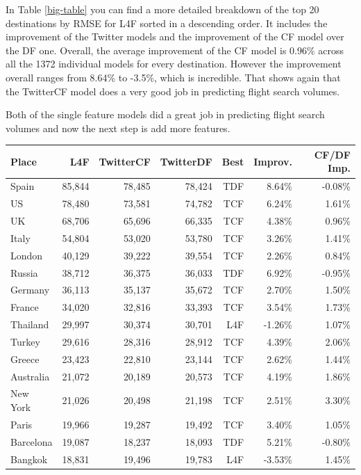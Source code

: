 \documentclass[minf,twoside,singlespacing,parskip,frontabs]{infthesis}
\begin{document}
In Table \ref{big-table} you can find a more detailed breakdown of the top 20 destinations by RMSE for L4F sorted in a descending order. It includes the improvement of the Twitter models and the improvement of the CF model over the DF one. Overall, the average improvement of the CF model is 0.96\% across all the 1372 individual models for every destination. However the improvement overall ranges from 8.64\% to -3.5\%, which is incredible. That shows again that the TwitterCF model does a very good job in predicting flight search volumes. 


Both of the single feature models did a great job in predicting flight search volumes and now the next step is add more features. 

\begin{table}[h]
\begin{center}
\begin{tabular}{ l | r | r | r | r | r | r }
Place & L4F &  TwitterCF & TwitterDF & Best & Improv. & CF/DF Imp. \\
\hline
Spain & 85,844 & 78,485 & 78,424 & TDF & 8.64\% & -0.08\%\\
US & 78,480 & 73,581 & 74,782 & TCF & 6.24\% & 1.61\%\\
UK & 68,706 & 65,696 & 66,335 & TCF & 4.38\% & 0.96\%\\
Italy & 54,804 & 53,020 & 53,780 & TCF & 3.26\% & 1.41\%\\
London & 40,129 & 39,222 & 39,554 & TCF & 2.26\% & 0.84\%\\
Russia & 38,712 & 36,375 & 36,033 & TDF & 6.92\% & -0.95\%\\
Germany & 36,113 & 35,137 & 35,672 & TCF & 2.70\% & 1.50\%\\
France & 34,020 & 32,816 & 33,393 & TCF & 3.54\% & 1.73\%\\
Thailand & 29,997 & 30,374 & 30,701 & L4F & -1.26\% & 1.07\%\\
Turkey & 29,616 & 28,316 & 28,912 & TCF & 4.39\% & 2.06\%\\
Greece & 23,423 & 22,810 & 23,144 & TCF & 2.62\% & 1.44\%\\
Australia & 21,072 & 20,189 & 20,573 & TCF & 4.19\% & 1.86\%\\
New York & 21,026 & 20,498 & 21,198 & TCF & 2.51\% & 3.30\%\\
Paris & 19,966 & 19,287 & 19,492 & TCF & 3.40\% & 1.05\%\\
Barcelona & 19,087 & 18,237 & 18,093 & TDF & 5.21\% & -0.80\%\\
Bangkok & 18,831 & 19,496 & 19,783 & L4F & -3.53\% & 1.45\%\\

\end{tabular}
\end{center}
\end{table}
\end{document}
